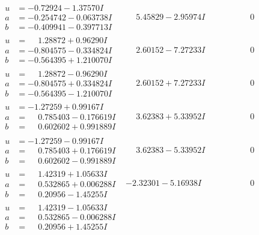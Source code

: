 \documentclass[1p]{elsarticle_modified}
\theoremstyle{definition}
\begin{document}
$$\begin{array}{c|c|c}
\begin{aligned}
u &= -0.72924 - 1.37570 I \\
a &= -0.254742 - 0.063738 I \\
b &= -0.409941 - 0.397713 I\end{aligned}
 & \phantom{-}5.45829 - 2.95974 I & \phantom{-0.000000 } 0 \\ \hline\begin{aligned}
u &= \phantom{-}1.28872 + 0.96290 I \\
a &= -0.804575 - 0.334824 I \\
b &= -0.564395 + 1.210070 I\end{aligned}
 & \phantom{-}2.60152 - 7.27233 I & \phantom{-0.000000 } 0 \\ \hline\begin{aligned}
u &= \phantom{-}1.28872 - 0.96290 I \\
a &= -0.804575 + 0.334824 I \\
b &= -0.564395 - 1.210070 I\end{aligned}
 & \phantom{-}2.60152 + 7.27233 I & \phantom{-0.000000 } 0 \\ \hline\begin{aligned}
u &= -1.27259 + 0.99167 I \\
a &= \phantom{-}0.785403 - 0.176619 I \\
b &= \phantom{-}0.602602 + 0.991889 I\end{aligned}
 & \phantom{-}3.62383 + 5.33952 I & \phantom{-0.000000 } 0 \\ \hline\begin{aligned}
u &= -1.27259 - 0.99167 I \\
a &= \phantom{-}0.785403 + 0.176619 I \\
b &= \phantom{-}0.602602 - 0.991889 I\end{aligned}
 & \phantom{-}3.62383 - 5.33952 I & \phantom{-0.000000 } 0 \\ \hline\begin{aligned}
u &= \phantom{-}1.42319 + 1.05633 I \\
a &= \phantom{-}0.532865 + 0.006288 I \\
b &= \phantom{-}0.20956 - 1.45255 I\end{aligned}
 & -2.32301 - 5.16938 I & \phantom{-0.000000 } 0 \\ \hline\begin{aligned}
u &= \phantom{-}1.42319 - 1.05633 I \\
a &= \phantom{-}0.532865 - 0.006288 I \\
b &= \phantom{-}0.20956 + 1.45255 I\end{aligned}

\end{array}$$
\end{document}
